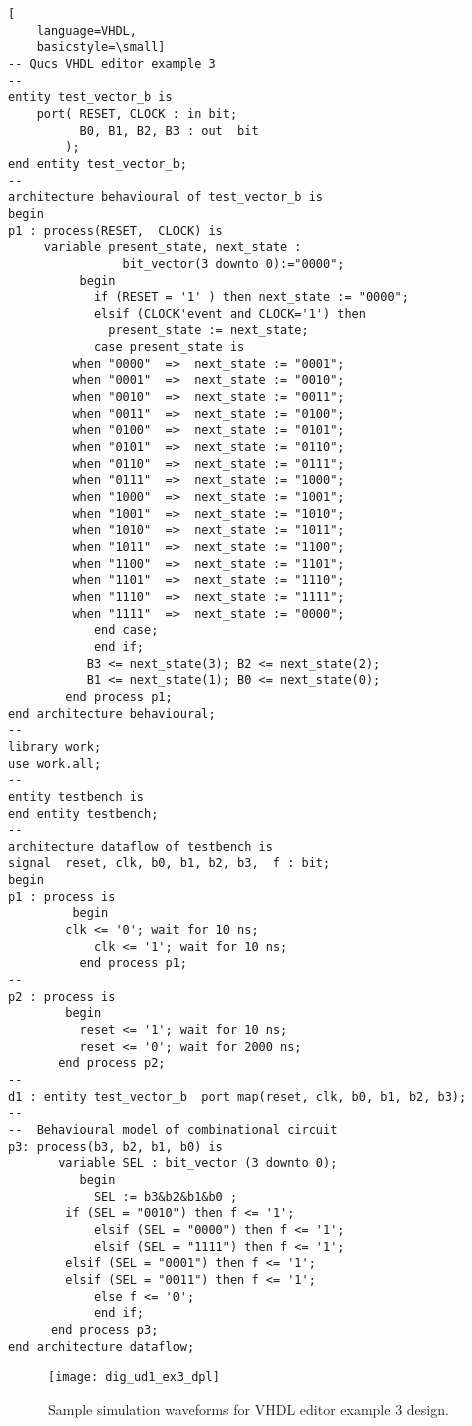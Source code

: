 \begin{itemize}
\begin{lstlisting}[
    language=VHDL,
    basicstyle=\small]
-- Qucs VHDL editor example 3
--
entity test_vector_b is
	port( RESET, CLOCK : in bit;
	      B0, B1, B2, B3 : out  bit
	    );
end entity test_vector_b;
--
architecture behavioural of test_vector_b is
begin
p1 : process(RESET,  CLOCK) is
     variable present_state, next_state :
                bit_vector(3 downto 0):="0000";
          begin	
            if (RESET = '1' ) then next_state := "0000";
            elsif (CLOCK'event and CLOCK='1') then
              present_state := next_state;
            case present_state is
	     when "0000"  =>  next_state := "0001";   
	     when "0001"  =>  next_state := "0010"; 
	     when "0010"  =>  next_state := "0011";  
	     when "0011"  =>  next_state := "0100";   
	     when "0100"  =>  next_state := "0101";   
	     when "0101"  =>  next_state := "0110";   
	     when "0110"  =>  next_state := "0111";   
	     when "0111"  =>  next_state := "1000";   
	     when "1000"  =>  next_state := "1001";   
	     when "1001"  =>  next_state := "1010"; 
	     when "1010"  =>  next_state := "1011"; 
	     when "1011"  =>  next_state := "1100"; 
	     when "1100"  =>  next_state := "1101"; 
	     when "1101"  =>  next_state := "1110"; 
	     when "1110"  =>  next_state := "1111"; 
	     when "1111"  =>  next_state := "0000";
            end case;
            end if;
           B3 <= next_state(3); B2 <= next_state(2); 
           B1 <= next_state(1); B0 <= next_state(0);
        end process p1;
end architecture behavioural;
--
library work;
use work.all;
--
entity testbench is
end entity testbench;
--
architecture dataflow of testbench is  
signal  reset, clk, b0, b1, b2, b3,  f : bit;
begin
p1 : process is
         begin
	    clk <= '0'; wait for 10 ns;
            clk <= '1'; wait for 10 ns;
          end process p1;
--
p2 : process is
        begin
          reset <= '1'; wait for 10 ns;
          reset <= '0'; wait for 2000 ns;
       end process p2;	
--
d1 : entity test_vector_b  port map(reset, clk, b0, b1, b2, b3);
--
--  Behavioural model of combinational circuit
p3: process(b3, b2, b1, b0) is
       variable SEL : bit_vector (3 downto 0);
          begin
            SEL := b3&b2&b1&b0 ;
	    if (SEL = "0010") then f <= '1';
            elsif (SEL = "0000") then f <= '1';
            elsif (SEL = "1111") then f <= '1';
	    elsif (SEL = "0001") then f <= '1';
	    elsif (SEL = "0011") then f <= '1';
            else f <= '0';
            end if;   
      end process p3;
end architecture dataflow;
\end{lstlisting}

\begin{figure}[ht]
  \centering
  \texttt{[image: dig\_ud1\_ex3\_dpl]}
  \caption{Sample simulation waveforms for VHDL editor example 3 design.}
  \label{fig:dig_ud1_ex3_dpl}
\end{figure} 

\end{itemize}

